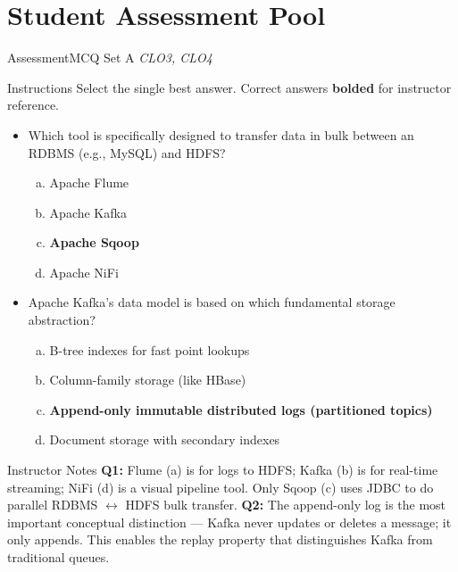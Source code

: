 \documentclass[aspectratio=169,10pt]{beamer}
\begin{document}
\section{Student Assessment Pool}

\begin{frame}{Assessment\textemdash MCQ Set A \hfill\small\textit{CLO3, CLO4}}
  \begin{exampleblock}{Instructions}
    Select the single best answer.  Correct answers \textbf{bolded} for instructor reference.
  \end{exampleblock}
  \vspace{6pt}
  \begin{itemize}
    \item[\textbf{Q1.}] Which tool is specifically designed to transfer data in bulk between an RDBMS (e.g., MySQL) and HDFS?
    \begin{enumerate}[(a)]
      \item Apache Flume
      \item Apache Kafka
      \item \textbf{Apache Sqoop}
      \item Apache NiFi
    \end{enumerate}
  \end{itemize}
  \vspace{8pt}
  \begin{itemize}
    \item[\textbf{Q2.}] Apache Kafka's data model is based on which fundamental storage abstraction?
    \begin{enumerate}[(a)]
      \item B-tree indexes for fast point lookups
      \item Column-family storage (like HBase)
      \item \textbf{Append-only immutable distributed logs (partitioned topics)}
      \item Document storage with secondary indexes
    \end{enumerate}
  \end{itemize}
  \vspace{6pt}
  \begin{alertblock}{Instructor Notes}
    \textbf{Q1:} Flume (a) is for logs to HDFS; Kafka (b) is for real-time streaming; NiFi (d) is a visual pipeline tool.  Only Sqoop (c) uses JDBC to do parallel RDBMS $\leftrightarrow$ HDFS bulk transfer.  \textbf{Q2:} The append-only log is the most important conceptual distinction --- Kafka never updates or deletes a message; it only appends.  This enables the replay property that distinguishes Kafka from traditional queues.
  \end{alertblock}
\end{frame}
\end{document}
